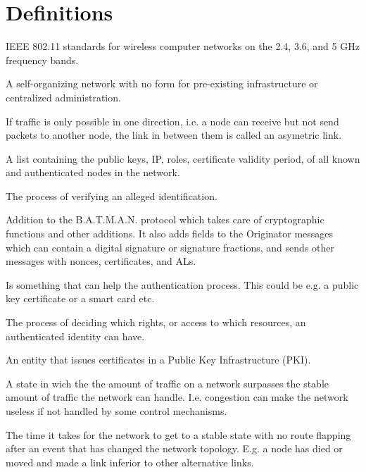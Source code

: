 \chapter*{Definitions}


\begin{acronym}

	IEEE 802.11 standards for wireless computer networks on the 2.4, 3.6, and 5 GHz
	frequency bands.

	A self-organizing network with no form for pre-existing infrastructure or
	centralized administration.

	If traffic is only possible in one direction, i.e. a node can receive but not
	send packets to another node, the link in between them is called an asymetric
	link.

	A list containing the public keys, IP, roles, certificate validity period,
	of all known and authenticated nodes in the network.

	The process of verifying an alleged identification.

	Addition to the B.A.T.M.A.N. protocol which takes care of cryptographic
	functions and other additions. It also adds fields to the Originator messages
	which can contain a digital signature or signature fractions, and sends other
	messages with nonces, certificates, and ALs.

	Is something that can help the authentication process. This could be e.g. a
	public key certificate or a smart card etc.

	The process of deciding which rights, or access to which resources, an
	authenticated identity can have.

	An entity that issues certificates in a Public Key Infrastructure (PKI).


	A state in wich the the amount of traffic on a network surpasses the stable
	amount of traffic the network can handle. I.e. congestion can make the network
	useless if not handled by some control mechanisms.
	
	The time it takes for the network to get to a stable state with no route
	flapping after an event that has changed the network topology. E.g. a node has
	died or moved and made a link inferior to other alternative links.


\end{acronym}
